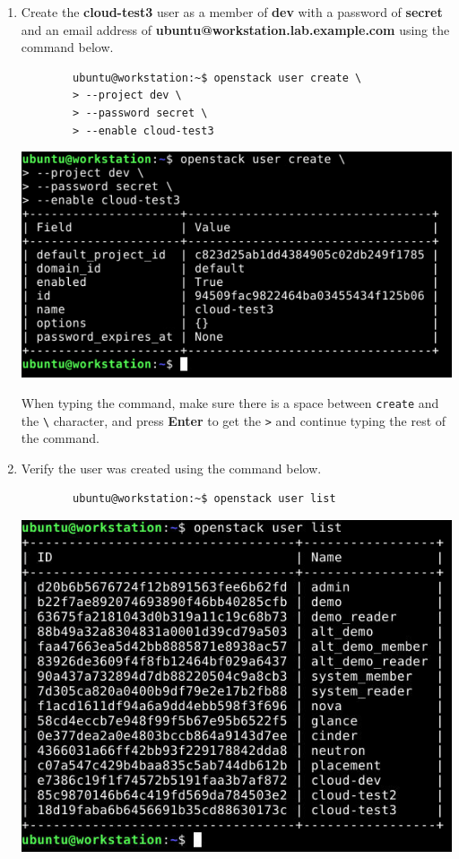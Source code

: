 \documentclass[letterpaper, 12pt]{article}
\begin{document}
\begin{enumerate}
    \item Create the \textbf{cloud-test3} user as a member of \textbf{dev} with a password of \textbf{secret} and an
    email address of \textbf{ubuntu@workstation.lab.example.com} using the command below.
    \begin{lstlisting}
        ubuntu@workstation:~$ openstack user create \
        > --project dev \
        > --password secret \
        > --enable cloud-test3
    \end{lstlisting}

    \begin{center}
        \includegraphics[width=\linewidth]{images/part4/step4.png}
    \end{center}

    \begin{tipbox}
        When typing the command, make sure there is a space between \texttt{create} and the \texttt{\textbackslash}
        character, and press \textbf{Enter} to get the \texttt{>} and continue typing the rest of the command.
    \end{tipbox}

    \item Verify the user was created using the command below.
    \begin{lstlisting}
        ubuntu@workstation:~$ openstack user list
    \end{lstlisting}

    \begin{center}
        \includegraphics[width=\linewidth]{images/part4/step5.png}
    \end{center}


\end{enumerate}
\end{document}
